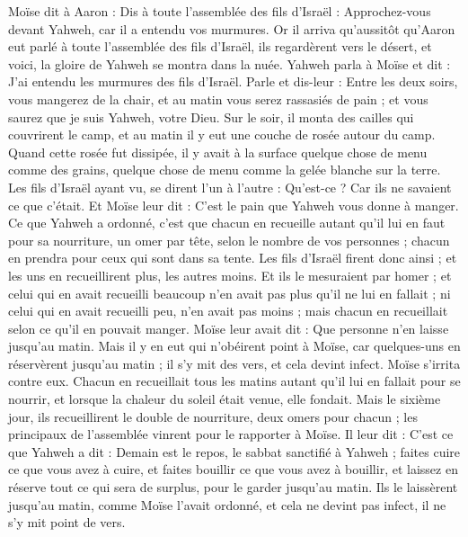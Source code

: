 \begin{multicols}{2}
Moïse dit à Aaron : Dis à toute l'assemblée des fils d'Israël : Approchez-vous devant Yahweh, car il a entendu vos murmures.
Or il arriva qu'aussitôt qu'Aaron eut parlé à toute l'assemblée des fils d'Israël, ils regardèrent vers le désert, et voici, la gloire de Yahweh se montra dans la nuée.
Yahweh parla à Moïse et dit :
J'ai entendu les murmures des fils d'Israël. Parle et dis-leur : Entre les deux soirs, vous mangerez de la chair, et au matin vous serez rassasiés de pain ; et vous saurez que je suis Yahweh, votre Dieu.
Sur le soir, il monta des cailles qui couvrirent le camp, et au matin il y eut une couche de rosée autour du camp.
Quand cette rosée fut dissipée, il y avait à la surface quelque chose de menu comme des grains, quelque chose de menu comme la gelée blanche sur la terre.
Les fils d'Israël ayant vu, se dirent l'un à l'autre : Qu'est-ce ? Car ils ne savaient ce que c'était. Et Moïse leur dit : C'est le pain que Yahweh vous donne à manger.
Ce que Yahweh a ordonné, c'est que chacun en recueille autant qu'il lui en faut pour sa nourriture, un omer par tête, selon le nombre de vos personnes ; chacun en prendra pour ceux qui sont dans sa tente.
Les fils d'Israël firent donc ainsi ; et les uns en recueillirent plus, les autres moins.
Et ils le mesuraient par homer ; et celui qui en avait recueilli beaucoup n'en avait pas plus qu'il ne lui en fallait ; ni celui qui en avait recueilli peu, n'en avait pas moins ; mais chacun en recueillait selon ce qu'il en pouvait manger.
Moïse leur avait dit : Que personne n'en laisse jusqu’au matin.
Mais il y en eut qui n'obéirent point à Moïse, car quelques-uns en réservèrent jusqu'au matin ; il s'y mit des vers, et cela devint infect. Moïse s’irrita contre eux.
Chacun en recueillait tous les matins autant qu'il lui en fallait pour se nourrir, et lorsque la chaleur du soleil était venue, elle fondait.
Mais le sixième jour, ils recueillirent le double de nourriture, deux omers pour chacun ; les principaux de l'assemblée vinrent pour le rapporter à Moïse.
Il leur dit : C'est ce que Yahweh a dit : Demain est le repos, le sabbat sanctifié à Yahweh ; faites cuire ce que vous avez à cuire, et faites bouillir ce que vous avez à bouillir, et laissez en réserve tout ce qui sera de surplus, pour le garder jusqu'au matin.
Ils le laissèrent jusqu’au matin, comme Moïse l'avait ordonné, et cela ne devint pas infect, il ne s’y mit point de vers.

\end{multicols}
